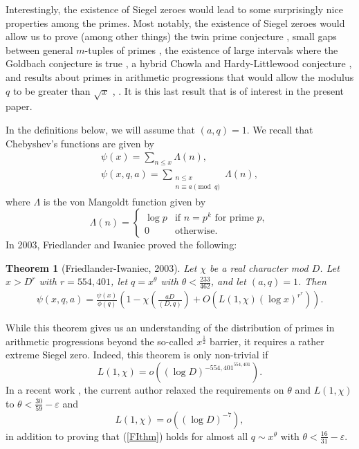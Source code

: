 \documentclass{amsart}
\newtheorem{theorem}{Theorem}[section]
\begin{document}
Interestingly, the existence of Siegel zeroes would lead to some surprisingly nice properties among the primes.  Most notably, the existence of Siegel zeroes would allow us to prove (among other things) the twin prime conjecture \cite{HB83}, small gaps between general $m$-tuples of primes \cite{WrS}, the existence of large intervals where the Goldbach conjecture is true \cite{MaMe}, a hybrid Chowla and Hardy-Littlewood conjecture \cite{TT}, and results about primes in arithmetic progressions that would allow the modulus $q$ to be greater than $\sqrt x$ \cite{FI03}, \cite{WrSiAP}.  It is this last result that is of interest in the present paper.

In the definitions below, we will assume that $(a,q)=1$.  We recall that Chebyshev's functions are given by
\begin{gather*}
\psi(x)=\sum_{n\leq x}\Lambda(n),\\
\psi(x,q,a)=\sum_{\substack{n\leq x\\n\equiv a\pmod q}}\Lambda(n),
\end{gather*}
where $\Lambda$ is the von Mangoldt function given by
$$\Lambda(n)=\begin{cases} \log p & \mbox{if }n=p^k\mbox{ for prime }p,\\ 0 & \mbox{otherwise.}\end{cases}$$
In 2003, Friedlander and Iwaniec \cite{FI03} proved the following:


\begin{theorem}[Friedlander-Iwaniec, 2003] \label{FIFI}
Let $\chi$ be a real character mod $D$.  Let $x>D^r$ with $r=554,401$, let $q=x^\theta$ with $\theta<\frac{233}{462}$, and let $(a,q)=1$.  Then
\begin{gather}\label{FIthm}\psi(x,q,a)=\frac{\psi(x)}{\phi(q)}\left(1-\chi\left(\frac{aD}{(D,q)}\right)+O\left(L(1,\chi)(\log x)^{r^r}\right)\right).
\end{gather}
\end{theorem}


While this theorem gives us an understanding of the distribution of primes in arithmetic progressions beyond the so-called $x^\frac 12$ barrier, it requires a rather extreme Siegel zero.  Indeed, this theorem is only non-trivial if
$$L(1,\chi)=o\left(\left(\log D\right)^{-{554,401}^{554,401}}\right).$$
In a recent work \cite{WrSiAP}, the current author relaxed the requirements on $\theta$ and $L(1,\chi)$ to $\theta<\frac{30}{59}-\varepsilon$ and
$$L(1,\chi)=o\left(\left(\log D\right)^{-7}\right),$$
in addition to proving that (\ref{FIthm}) holds for almost all $q\sim x^\theta$ with $\theta<\frac{16}{31}-\varepsilon$.
\end{document}

